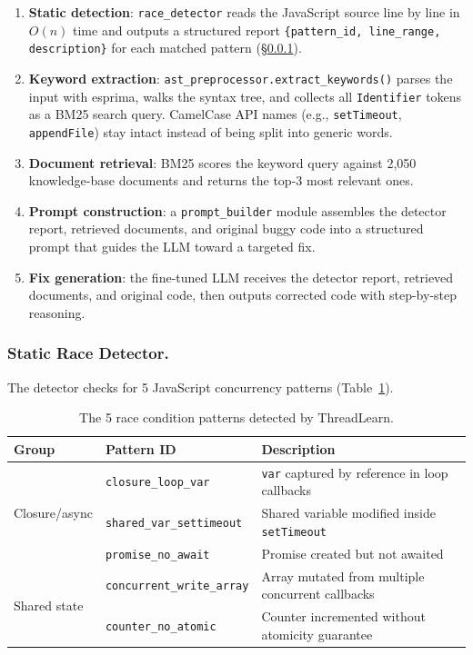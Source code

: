 \documentclass[runningheads]{llncs}
\begin{document}
\begin{enumerate}[leftmargin=2em]
  \item \textbf{Static detection}: \texttt{race\_detector} reads the
    JavaScript source line by line in $O(n)$ time and outputs a structured
    report \texttt{\{pattern\_id, line\_range, description\}} for each
    matched pattern (\S\ref{sec:design:detector}).
  \item \textbf{Keyword extraction}: \texttt{ast\_preprocessor.extract\_keywords()}
    parses the input with esprima, walks the syntax tree, and collects
    all \texttt{Identifier} tokens as a BM25 search query.
    CamelCase API names (e.g., \texttt{setTimeout}, \texttt{appendFile})
    stay intact instead of being split into generic words.
  \item \textbf{Document retrieval}: BM25 scores the keyword query against
    2,050 knowledge-base documents and returns the top-3 most relevant
    ones.
  \item \textbf{Prompt construction}: a \texttt{prompt\_builder} module
    assembles the detector report, retrieved documents, and original
    buggy code into a structured prompt that guides the LLM toward a
    targeted fix.
  \item \textbf{Fix generation}: the fine-tuned LLM receives the detector
    report, retrieved documents, and original code, then outputs corrected
    code with step-by-step reasoning.
\end{enumerate}

\subsubsection{Static Race Detector.}
\label{sec:design:detector}

The detector checks for 5 JavaScript concurrency patterns (Table~\ref{tab:patterns}).

\begin{table}[H]
  \centering
  \caption{The 5 race condition patterns detected by ThreadLearn.}
  \label{tab:patterns}
  \begin{tabular}{@{}lll@{}}
    \toprule
    \textbf{Group} & \textbf{Pattern ID} & \textbf{Description} \\
    \midrule
    \multirow{3}{*}{Closure/async}
      & \texttt{closure\_loop\_var}       & \texttt{var} captured by reference in loop callbacks \\
      & \texttt{shared\_var\_settimeout}  & Shared variable modified inside \texttt{setTimeout} \\
      & \texttt{promise\_no\_await}       & Promise created but not awaited \\
    \midrule
    \multirow{2}{*}{Shared state}
      & \texttt{concurrent\_write\_array} & Array mutated from multiple concurrent callbacks \\
      & \texttt{counter\_no\_atomic}      & Counter incremented without atomicity guarantee \\
    \bottomrule
  \end{tabular}
\end{table}
\end{document}
